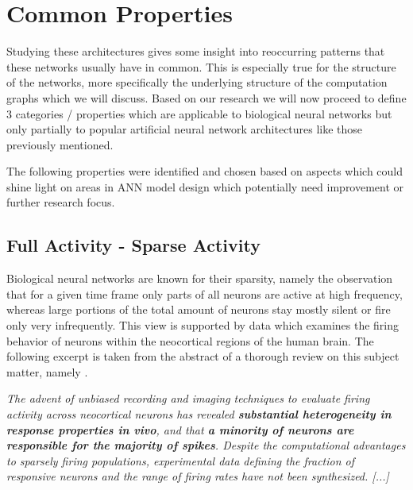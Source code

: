 \clearpage
 
\section{Common Properties}\label{sec_common-properties}
 
Studying these architectures gives some insight into reoccurring patterns that these networks usually have in common. 
This is especially true for the structure of the networks, more specifically the underlying structure of the computation graphs which we will discuss. 
Based on our research we will now proceed to define 3 categories / properties which are applicable to biological neural networks but only partially to popular artificial neural network architectures like those previously mentioned.

The following properties were identified and chosen based on aspects which could shine light on areas in ANN model design which potentially need improvement or further research focus. 

\clearpage

\subsection{Full Activity - Sparse Activity} \label{subsec_sparse-activity}

Biological neural networks are known for their sparsity, namely the observation that for a given time frame only parts of all neurons are active at high frequency, whereas large portions of the total amount of neurons stay mostly silent or fire only very infrequently.
This view is supported by data which examines the firing behavior of neurons
within the neocortical regions of the human brain. 
The following excerpt is taken from the abstract of a thorough review on this subject matter, namely . 


\begin{displayquote}
\textit{
The advent of unbiased recording and imaging techniques to evaluate firing activity across neocortical neurons has revealed \textbf{substantial heterogeneity in response properties in vivo}, and that \textbf{a minority of neurons are responsible for the majority of spikes}. Despite the computational advantages to sparsely firing populations, experimental data defining the fraction of responsive neurons and the range of firing rates have not been synthesized. [...]
}
\end{displayquote}

